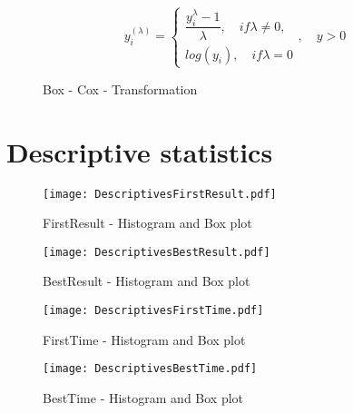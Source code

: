 \begin{figure}[htbp]
\caption{Box - Cox - Transformation}
\label{BoxCoxTransformation}
\begin{equation}
y_i^{(\lambda)} = \begin{cases}
\dfrac{y_i^{\lambda}-1}{\lambda}, \quad if \lambda \neq 0, \\ 
log(y_i), \quad if \lambda = 0
\end{cases}, \quad y > 0 
\end{equation}

\end{figure}

\section{Descriptive statistics}
		\label{Appendix-Descriptive}
		
\begin{figure}[htbp] %
\begin{center} 
\texttt{[image: DescriptivesFirstResult.pdf]}
  \caption{FirstResult - Histogram and Box plot}
    \label{DistributionFirstResult} 
\end{center}
\end{figure}

\begin{figure}[htbp] %
\begin{center} 
\texttt{[image: DescriptivesBestResult.pdf]}
  \caption{BestResult - Histogram and Box plot}
    \label{DistributionBestResult} 
\end{center}
\end{figure}

\begin{figure}[htbp] %
\begin{center} 
\texttt{[image: DescriptivesFirstTime.pdf]}
  \caption{FirstTime - Histogram and Box plot}
    \label{DistributionFirstTime} 
\end{center}
\end{figure}
\begin{figure}[htbp] %
\begin{center} 
\texttt{[image: DescriptivesBestTime.pdf]}
  \caption{BestTime - Histogram and Box plot}
    \label{DistributionBestTime} 
\end{center}
\end{figure}

